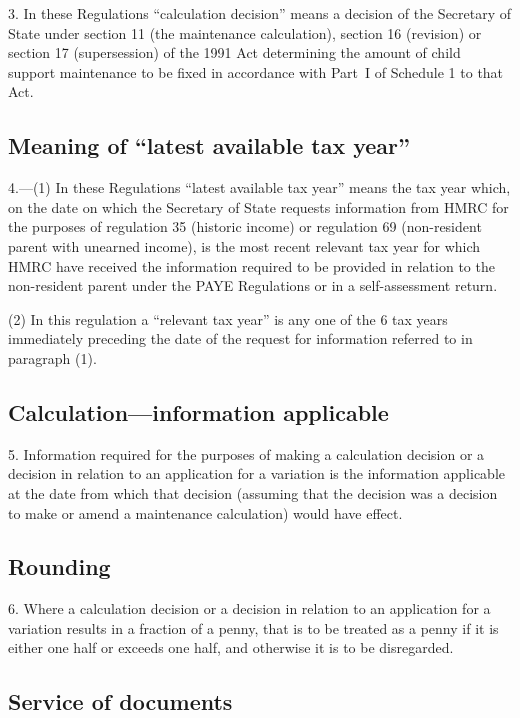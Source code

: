 \documentclass[12pt,a4paper]{article}
\begin{document}
3.  In these Regulations “calculation decision” means a decision of the Secretary of State under section 11 (the maintenance calculation), section 16 (revision) or section 17 (supersession) of the 1991 Act determining the amount of child support maintenance to be fixed in accordance with Part~I of Schedule 1 to that Act.

\subsection[4. Meaning of “latest available tax year”]{Meaning of “latest available tax year”}

4.---(1)  In these Regulations “latest available tax year” means the tax year which, on the date on which the Secretary of State requests information from HMRC for the purposes of regulation 35 (historic income) or regulation 69 (non-resident parent with unearned income), is the most recent relevant tax year for which HMRC have received the information required to be provided in relation to the non-resident parent under the PAYE Regulations or in a self-assessment return.

(2) In this regulation a “relevant tax year” is any one of the 6 tax years immediately preceding the date of the request for information referred to in paragraph (1).

\subsection[5. Calculation---information applicable]{Calculation---information applicable}

5.  Information required for the purposes of making a calculation decision or a decision in relation to an application for a variation is the information applicable at the date from which that decision (assuming that the decision was a decision to make or amend a maintenance calculation) would have effect.

\subsection[6. Rounding]{Rounding}

6.  Where a calculation decision or a decision in relation to an application for a variation results in a fraction of a penny, that is to be treated as a penny if it is either one half or exceeds one half, and otherwise it is to be disregarded.

\subsection[7. Service of documents]{Service of documents}
\end{document}
